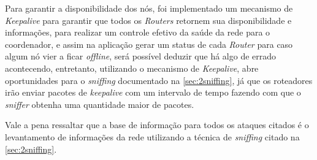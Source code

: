 \par Para garantir a disponibilidade dos n\'os, foi implementado um mecanismo de \emph{Keepalive} para garantir que todos os \emph{Routers} retornem sua disponibilidade e informa\c{c}\~oes, para realizar um controle efetivo da sa\'ude da rede para o coordenador, e assim na aplica\c{c}\~ao gerar um status de cada \emph{Router} para caso algum n\'o vier a ficar \emph{offline}, ser\'a poss\'ivel deduzir que h\'a algo de errado acontecendo, entretanto, utilizando o mecanismo de \emph{Keepalive}, abre oportunidades para o \emph{sniffing} documentado na \autoref{sec:2sniffing}, j\'a que os roteadores ir\~ao enviar pacotes de \emph{keepalive} com um intervalo de tempo fazendo com que o \emph{sniffer} obtenha uma quantidade maior de pacotes.

\par Vale a pena ressaltar que a base de informa\c{c}\~ao para todos os ataques citados \'e o levantamento de informa\c{c}\~oes da rede utilizando a t\'ecnica de \emph{sniffing} citado na \autoref{sec:2sniffing}.